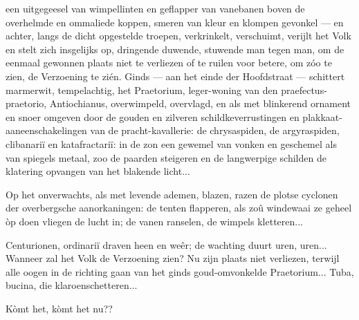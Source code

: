 \documentclass[a4paper, 12pt, oneside, dutch]{article}
\begin{document}
een uitgegeesel van wimpellinten en geflapper van vanebanen boven de overhelmde en ommaliede koppen, smeren van kleur en klompen gevonkel --- en achter, langs de dicht opgestelde troepen, verkrinkelt, verschuimt, verijlt het Volk en stelt zich insgelijks op, dringende duwende, stuwende man tegen man, om de eenmaal gewonnen plaats niet te verliezen of te ruilen voor betere, om zóo te zien, de Verzoening te zién. Ginds --- aan het einde der Hoofdstraat --- schittert marmerwit, tempelachtig, het Praetorium, leger-woning van den praefectus-praetorio, Antiochianus, overwimpeld, overvlagd, en als met blinkerend ornament en snoer omgeven door de gouden en zilveren schildkeverrustingen en plakkaat-aaneenschakelingen van de pracht-kavallerie: de chrysaspiden, de argyraspiden, clibanariï en katafractariï: in de zon een gewemel van vonken en geschemel als van spiegels metaal, zoo de paarden steigeren en de langwerpige schilden de klatering opvangen van het blakende licht...

Op het onverwachts, als met levende ademen, blazen, razen de plotse cyclonen der overbergsche aanorkaningen: de tenten flapperen, als zoû windewaai ze geheel òp doen vliegen de lucht in; de vanen ranselen, de wimpels kletteren...

Centurionen, ordinariï draven heen en weêr; de wachting duurt uren, uren... Wanneer zal het Volk de Verzoening zien? Nu zijn plaats niet verliezen, terwijl alle oogen in de richting gaan van het ginds goud-omvonkelde Praetorium... Tuba, bucina, die klaroenschetteren...

Kòmt het, kòmt het nu??
\end{document}
